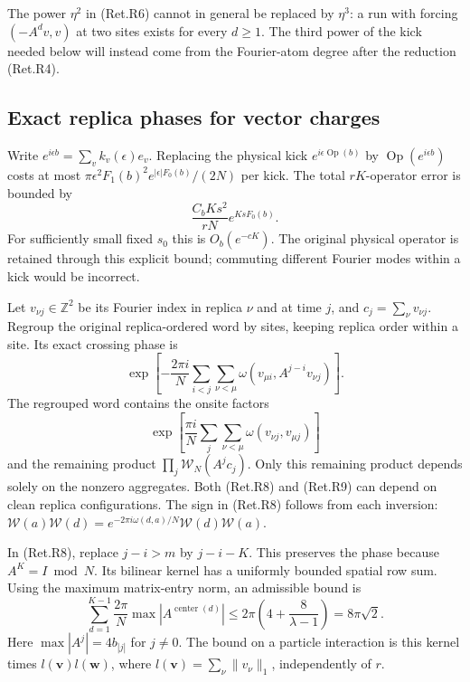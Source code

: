 The power \(\eta^2\) in (Ret.R6) cannot in general be replaced by \(\eta^3\):
a run with forcing \((-A^dv,v)\) at two sites exists for every \(d\ge1\).
The third power of the kick needed below will instead come from the
Fourier-atom degree after the reduction (Ret.R4).

\hypertarget{exact-replica-phases-for-vector-charges}{%
\subsection{Exact replica phases for vector charges}\label{exact-replica-phases-for-vector-charges}}

Write \(e^{i\epsilon b}=\sum_v k_v(\epsilon)e_v\).
Replacing the physical kick \(e^{i\epsilon\operatorname{Op}(b)}\) by
\(\operatorname{Op}(e^{i\epsilon b})\) costs at most
\(\pi\epsilon^2F_1(b)^2e^{|\epsilon|F_0(b)}/(2N)\) per kick.
The total \(rK\)-operator error is bounded by
\[
                \frac{C_bKs^2}{rN}e^{KsF_0(b)}.            \tag{Ret.R7}
\]
For sufficiently small fixed \(s_0\) this is \(O_b(e^{-cK})\).
The original physical operator is retained through this explicit bound;
commuting different Fourier modes within a kick would be incorrect.

Let \(v_{\nu j}\in\mathbb Z^2\) be its Fourier index in replica \(\nu\)
and at time \(j\), and \(c_j=\sum_\nu v_{\nu j}\).
Regroup the original replica-ordered word by sites, keeping replica order
within a site. Its exact crossing phase is
\[
 \exp\left[-\frac{2\pi i}{N}
     \sum_{i<j}\sum_{\nu<\mu}
                 \omega(v_{\mu i},A^{j-i}v_{\nu j})\right]. \tag{Ret.R8}
\]
The regrouped word contains the onsite factors
\[
 \exp\left[\frac{\pi i}{N}\sum_j\sum_{\nu<\mu}
                      \omega(v_{\nu j},v_{\mu j})\right]   \tag{Ret.R9}
\]
and the remaining product \(\prod_j\mathcal W_N(A^jc_j)\).
Only this remaining product depends solely on the nonzero aggregates.
Both (Ret.R8) and (Ret.R9) can depend on clean replica configurations.
The sign in (Ret.R8) follows from each inversion:
\(\mathcal W(a)\mathcal W(d) =e^{-2\pi i\omega(d,a)/N}\mathcal W(d)\mathcal W(a)\).

In (Ret.R8), replace \(j-i>m\) by \(j-i-K\). This preserves the phase because
\(A^K=I\bmod N\). Its bilinear kernel has a uniformly bounded spatial row
sum. Using the maximum matrix-entry norm, an admissible bound is
\[
 \sum_{d=1}^{K-1}\frac{2\pi}{N}
             \max|A^{\operatorname{center}(d)}|
 \le2\pi\left(4+\frac8{\lambda-1}\right)=8\pi\sqrt2.        \tag{Ret.R10}
\]
Here \(\max|A^j|=4b_{|j|}\) for \(j\ne0\).
The bound on a particle interaction is this kernel times
\(l(\boldsymbol v)l(\boldsymbol w)\), where
\(l(\boldsymbol v)=\sum_\nu\|v_\nu\|_1\), independently of \(r\).

